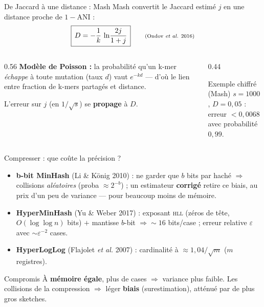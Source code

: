 \documentclass[aspectratio=169,11pt]{beamer}
\begin{document}
\begin{frame}{De Jaccard à une distance : Mash}
  \footnotesize
  Mash convertit le Jaccard estimé $j$ en une distance proche de $1-\text{ANI}$ :
  \[ \boxed{\,D = -\frac{1}{k}\,\ln\!\frac{2j}{1+j}\,}
     \qquad \text{\scriptsize(Ondov \textit{et al.} 2016)} \]
  \begin{columns}[T]
    \begin{column}{0.56\textwidth}
      \textbf{Modèle de Poisson :} la probabilité qu'un k-mer \emph{échappe} à toute
      mutation (taux $d$) vaut $e^{-k d}$ — d'où le lien entre fraction de k-mers
      partagés et distance.
      \smallskip

      L'erreur sur $j$ (en $1/\sqrt{s}$) se \textbf{propage} à $D$.
    \end{column}
    \begin{column}{0.44\textwidth}
      \begin{exampleblock}{Exemple chiffré (Mash)}
        \footnotesize
        $s = 1000$, $D = 0{,}05$ :\\
        erreur $< 0{,}0068$ avec probabilité $0{,}99$.
      \end{exampleblock}
    \end{column}
  \end{columns}
\end{frame}

\begin{frame}{Compresser : que coûte la précision ?}
  \footnotesize
  \begin{itemize}
    \item \textbf{b-bit MinHash} (Li \& König 2010) : ne garder que $b$ bits par haché
          $\Rightarrow$ collisions \emph{aléatoires} (proba $\approx 2^{-b}$) ; un estimateur
          \textbf{corrigé} retire ce biais, au prix d'un peu de variance — pour beaucoup
          moins de mémoire.
    \item \textbf{HyperMinHash} (Yu \& Weber 2017) : exposant \textsc{hll} (zéros de tête,
          $O(\log\log n)$ bits) $+$ mantisse $b$-bit $\Rightarrow \sim 16$ bits/case ;
          erreur relative $\varepsilon$ avec $\sim \varepsilon^{-2}$ cases.
    \item \textbf{HyperLogLog} (Flajolet \textit{et al.} 2007) : cardinalité à
          $\approx 1{,}04/\sqrt{m}$ ($m$ registres).
  \end{itemize}
  \begin{alertblock}{Compromis}
    \footnotesize
    À \textbf{mémoire égale}, plus de cases $\Rightarrow$ variance plus faible.
    Les collisions de la compression $\Rightarrow$ léger \textbf{biais} (surestimation),
    atténué par de plus gros sketches.
  \end{alertblock}
\end{frame}
\end{document}
